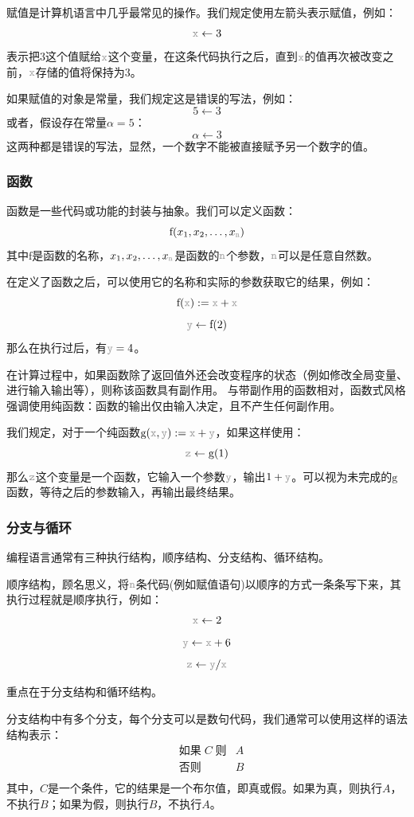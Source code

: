 \documentclass[12pt,a4paper,UTF8]{ctexart}
\newcommand{\var}[1]{\textcolor{lightgray}{\mathtt{#1}}}
\begin{document}
\qquad 赋值是计算机语言中几乎最常见的操作。我们规定使用左箭头表示赋值，例如：
\[\var{x} \leftarrow 3\]
表示把$3$这个值赋给$\var{x}$这个变量，在这条代码执行之后，直到$\var{x}$的值再次被改变之前，$\var{x}$存储的值将保持为$3$。

\qquad 如果赋值的对象是常量，我们规定这是错误的写法，例如：
\[5 \leftarrow 3\]
或者，假设存在常量$\alpha = 5$：
\[\alpha \leftarrow 3\]
这两种都是错误的写法，显然，一个数字不能被直接赋予另一个数字的值。

\subsubsection{函数}

\qquad 函数是一些代码或功能的封装与抽象。我们可以定义函数：
\[\mathrm{f}(x_1, x_2, \dots, x_{\var{n}})\]
其中$\mathrm{f}$是函数的名称，$x_1, x_2, \dots, x_{\var{n}}$是函数的$\var{n}$个参数，$\var{n}$可以是任意自然数。

\qquad 在定义了函数之后，可以使用它的名称和实际的参数获取它的结果，例如：
\[\mathrm{f}(\var{x}) := \var{x} + \var{x}\]
\[\var{y} \leftarrow \mathrm{f}(2)\]
那么在执行过后，有$\var{y} = 4$。

\qquad 在计算过程中，如果函数除了返回值外还会改变程序的状态（例如修改全局变量、进行输入输出等），则称该函数具有副作用。
与带副作用的函数相对，函数式风格强调使用纯函数：函数的输出仅由输入决定，且不产生任何副作用。

\qquad 我们规定，对于一个纯函数$\mathrm{g}(\var{x}, \var{y}) := \var{x} + \var{y}$，如果这样使用：
\[\var{z} \leftarrow \mathrm{g}(1)\]
那么$\var{z}$这个变量是一个函数，它输入一个参数$\var{y}$，输出$1 + \var{y}$。可以视为未完成的$\mathrm{g}$函数，等待之后的参数输入，再输出最终结果。

\subsubsection{分支与循环}

\qquad 编程语言通常有三种执行结构，顺序结构、分支结构、循环结构。

\qquad 顺序结构，顾名思义，将$\var{n}$条代码(例如赋值语句)以顺序的方式一条条写下来，其执行过程就是顺序执行，例如：
\[\var{x} \leftarrow 2\]
\[\var{y} \leftarrow \var{x} + 6\]
\[\var{z} \leftarrow \var{y} / \var{x}\]

重点在于分支结构和循环结构。

\qquad 分支结构中有多个分支，每个分支可以是数句代码，我们通常可以使用这样的语法结构表示：
\begin{align*}
    &\text{如果} \; C \; \text{则} &A \\
    &\text{否则} &B \\
\end{align*}
其中，$C$是一个条件，它的结果是一个布尔值，即真或假。如果为真，则执行$A$，不执行$B$；如果为假，则执行$B$，不执行$A$。
\end{document}
